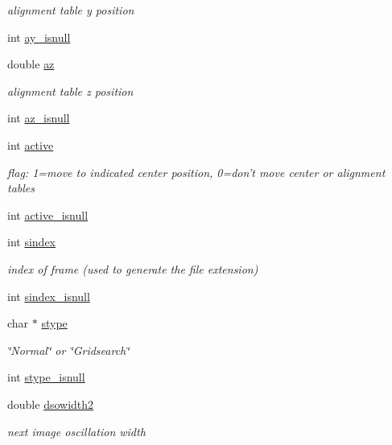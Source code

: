 \begin{DoxyCompactItemize}
\begin{DoxyCompactList}\small\item\em alignment table y position \end{DoxyCompactList}\item 
int \hyperlink{structlspg__nextshot__struct_a9da91abc8090532ed98ccd47a3bab775}{ay\-\_\-isnull}
\item 
double \hyperlink{structlspg__nextshot__struct_a66e678866ce79f6398b66d033ae45a17}{az}
\begin{DoxyCompactList}\small\item\em alignment table z position \end{DoxyCompactList}\item 
int \hyperlink{structlspg__nextshot__struct_aaebd6d432810313294b5fed5f4445cb1}{az\-\_\-isnull}
\item 
int \hyperlink{structlspg__nextshot__struct_a1a94eefbad713976a3d9213695a6ca28}{active}
\begin{DoxyCompactList}\small\item\em flag\-: 1=move to indicated center position, 0=don't move center or alignment tables \end{DoxyCompactList}\item 
int \hyperlink{structlspg__nextshot__struct_a9f777671ec617a0f533b3c51f28babb3}{active\-\_\-isnull}
\item 
int \hyperlink{structlspg__nextshot__struct_a5d096f2c2bf9be29c44129b54eaf01da}{sindex}
\begin{DoxyCompactList}\small\item\em index of frame (used to generate the file extension) \end{DoxyCompactList}\item 
int \hyperlink{structlspg__nextshot__struct_a7ca4fbc86974d1b75a681ba5ecaaf5af}{sindex\-\_\-isnull}
\item 
char $\ast$ \hyperlink{structlspg__nextshot__struct_ab5a70b189c2fe516ca0c84bd06f3e564}{stype}
\begin{DoxyCompactList}\small\item\em \char`\"{}\-Normal\char`\"{} or \char`\"{}\-Gridsearch\char`\"{} \end{DoxyCompactList}\item 
int \hyperlink{structlspg__nextshot__struct_a79f48c452a4aca8506bae22f897c7441}{stype\-\_\-isnull}
\item 
double \hyperlink{structlspg__nextshot__struct_a5378e13735a5392a9fcd853ce8c9e929}{dsowidth2}
\begin{DoxyCompactList}\small\item\em next image oscillation width \end{DoxyCompactList}\item 

\end{DoxyCompactItemize}
